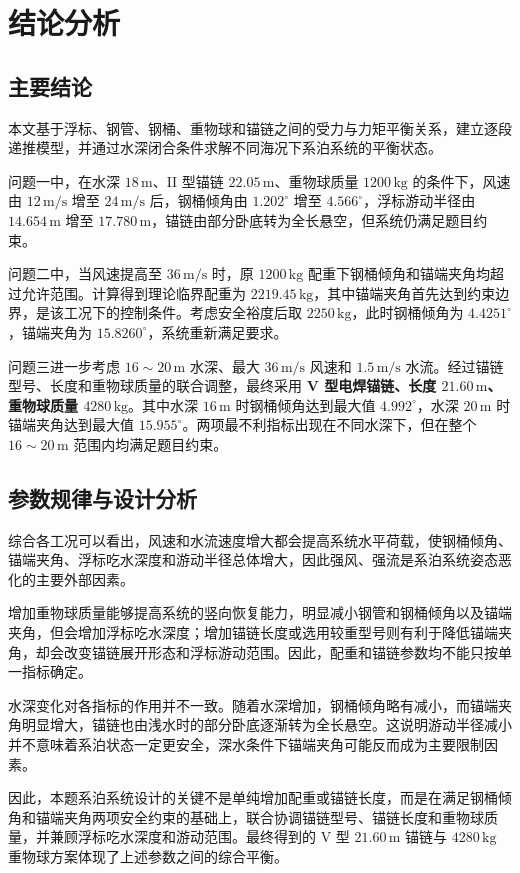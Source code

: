 \section{结论分析}

\subsection{主要结论}

本文基于浮标、钢管、钢桶、重物球和锚链之间的受力与力矩平衡关系，建立逐段递推模型，并通过水深闭合条件求解不同海况下系泊系统的平衡状态。

问题一中，在水深 \(18\,\mathrm m\)、II 型锚链 \(22.05\,\mathrm m\)、重物球质量 \(1200\,\mathrm{kg}\) 的条件下，风速由 \(12\,\mathrm{m/s}\) 增至 \(24\,\mathrm{m/s}\) 后，钢桶倾角由 \(1.202^\circ\) 增至 \(4.566^\circ\)，浮标游动半径由 \(14.654\,\mathrm m\) 增至 \(17.780\,\mathrm m\)，锚链由部分卧底转为全长悬空，但系统仍满足题目约束。

问题二中，当风速提高至 \(36\,\mathrm{m/s}\) 时，原 \(1200\,\mathrm{kg}\) 配重下钢桶倾角和锚端夹角均超过允许范围。计算得到理论临界配重为 \(2219.45\,\mathrm{kg}\)，其中锚端夹角首先达到约束边界，是该工况下的控制条件。考虑安全裕度后取 \(2250\,\mathrm{kg}\)，此时钢桶倾角为 \(4.4251^\circ\)，锚端夹角为 \(15.8260^\circ\)，系统重新满足要求。

问题三进一步考虑 \(16\sim20\,\mathrm m\) 水深、最大 \(36\,\mathrm{m/s}\) 风速和 \(1.5\,\mathrm{m/s}\) 水流。经过锚链型号、长度和重物球质量的联合调整，最终采用 \textbf{V 型电焊锚链、长度 \(21.60\,\mathrm m\)、重物球质量 \(4280\,\mathrm{kg}\)}。其中水深 \(16\,\mathrm m\) 时钢桶倾角达到最大值 \(4.992^\circ\)，水深 \(20\,\mathrm m\) 时锚端夹角达到最大值 \(15.955^\circ\)。两项最不利指标出现在不同水深下，但在整个 \(16\sim20\,\mathrm m\) 范围内均满足题目约束。

\subsection{参数规律与设计分析}

综合各工况可以看出，风速和水流速度增大都会提高系统水平荷载，使钢桶倾角、锚端夹角、浮标吃水深度和游动半径总体增大，因此强风、强流是系泊系统姿态恶化的主要外部因素。

增加重物球质量能够提高系统的竖向恢复能力，明显减小钢管和钢桶倾角以及锚端夹角，但会增加浮标吃水深度；增加锚链长度或选用较重型号则有利于降低锚端夹角，却会改变锚链展开形态和浮标游动范围。因此，配重和锚链参数均不能只按单一指标确定。

水深变化对各指标的作用并不一致。随着水深增加，钢桶倾角略有减小，而锚端夹角明显增大，锚链也由浅水时的部分卧底逐渐转为全长悬空。这说明游动半径减小并不意味着系泊状态一定更安全，深水条件下锚端夹角可能反而成为主要限制因素。

因此，本题系泊系统设计的关键不是单纯增加配重或锚链长度，而是在满足钢桶倾角和锚端夹角两项安全约束的基础上，联合协调锚链型号、锚链长度和重物球质量，并兼顾浮标吃水深度和游动范围。最终得到的 V 型 \(21.60\,\mathrm m\) 锚链与 \(4280\,\mathrm{kg}\) 重物球方案体现了上述参数之间的综合平衡。
